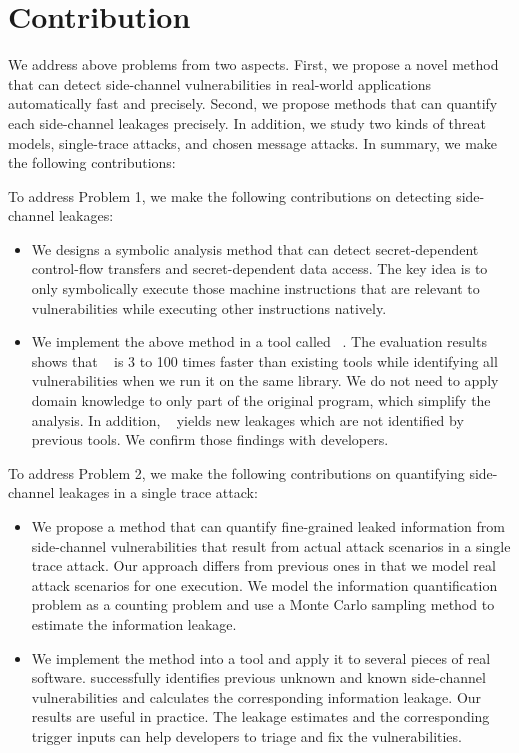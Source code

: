 \section{Contribution}
We address above problems from two aspects. First, we propose a novel method that can detect side-channel vulnerabilities in real-world applications automatically fast and precisely. Second, we propose methods that can quantify each side-channel leakages precisely. In addition, we study two kinds of threat models, single-trace attacks, and chosen message attacks. In summary, we make the following contributions:

To address Problem 1, we make the following contributions on detecting side-channel leakages:

\begin{itemize}
    \item We designs a symbolic analysis method that can detect secret-dependent control-flow transfers and secret-dependent data access. The key idea is to only symbolically execute those machine instructions that are relevant to vulnerabilities while executing other instructions natively.
    \item We implement the above method in a tool called ~\detect{}. The evaluation results shows that ~\detect{}  is 3 to 100 times faster than existing tools while identifying all vulnerabilities when we run it on the same library.  We do not need to apply domain knowledge to only part of the original program, which simplify the analysis. In addition, ~\detect{} yields new leakages which are not identified by previous tools. We confirm those findings with developers.
\end{itemize}

To address Problem 2, we make the following contributions on quantifying side-channel leakages in a single trace attack:


\begin{itemize}
    \item We propose a method that can quantify fine-grained leaked
          information from side-channel vulnerabilities that result from actual attack
          scenarios in a single trace attack. Our approach differs from previous ones in that we
          model real attack scenarios for one execution.
          We model the information quantification problem as a counting problem
          and use a Monte Carlo sampling method to estimate the information leakage.
    \item We implement the method into a tool and apply it
          to several pieces of real software. \tool{} successfully identifies
          previous unknown and known side-channel vulnerabilities and calculates the corresponding information leakage.
          Our results are useful in practice.
          The leakage estimates and the corresponding trigger inputs can
          help developers to triage and fix the vulnerabilities.
\end{itemize}

